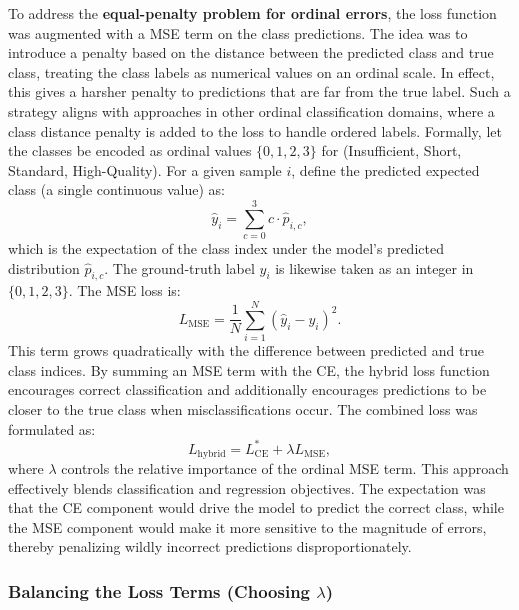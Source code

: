 To address the \textbf{equal-penalty problem for ordinal errors}, the loss function was augmented with a \ac{MSE} term on the class predictions. The idea was to introduce a penalty based on the distance between the predicted class and true class, treating the class labels as numerical values on an ordinal scale. In effect, this gives a harsher penalty to predictions that are far from the true label. Such a strategy aligns with approaches in other ordinal classification domains, where a class distance penalty is added to the loss to handle ordered labels. Formally, let the classes be encoded as ordinal values $\{0,1,2,3\}$ for (Insufficient, Short, Standard, High-Quality). For a given sample $i$, define the predicted expected class (a single continuous value) as:
\begin{equation}
    \hat{y}_i = \sum_{c=0}^{3} c \cdot \hat{p}_{i,c},
\end{equation}
which is the expectation of the class index under the model's predicted distribution $\hat{p}_{i,c}$. The ground-truth label $y_i$ is likewise taken as an integer in $\{0,1,2,3\}$. The \ac{MSE} loss is:
\begin{equation}
    L_{\mathrm{MSE}} = \frac{1}{N} \sum_{i=1}^{N} (\hat{y}_i - y_i)^2.
\end{equation}
This term grows quadratically with the difference between predicted and true class indices. By summing an \ac{MSE} term with the \ac{CE}, the hybrid loss function encourages correct classification and additionally encourages predictions to be closer to the true class when misclassifications occur. The combined loss was formulated as:
\begin{equation}
    L_{\mathrm{hybrid}} = L_{\mathrm{CE}}^{*} + \lambda L_{\mathrm{MSE}},
\end{equation}
where $\lambda$ controls the relative importance of the ordinal \ac{MSE} term. This approach effectively blends classification and regression objectives. The expectation was that the \ac{CE} component would drive the model to predict the correct class, while the \ac{MSE} component would make it more sensitive to the magnitude of errors, thereby penalizing wildly incorrect predictions disproportionately.

\subsubsection{Balancing the Loss Terms (Choosing $\lambda$)}

